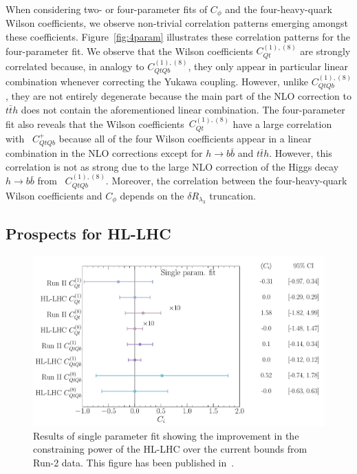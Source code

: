 	When considering two- or four-parameter fits of $C_\phi$ and the four-heavy-quark Wilson coefficients, we observe non-trivial correlation patterns emerging amongst these coefficients.  Figure~\ref{fig:4param} illustrates these correlation patterns for the four-parameter fit. 
	We observe that the Wilson coefficients $C_{Qt}^{(1),(8) }$ are strongly correlated because, in analogy to $C_{QtQb}^{(1),(8) }$, they only appear in particular linear combination whenever correcting the Yukawa coupling. However,  unlike $C_{QtQb}^{(1),(8) }$, they are not entirely degenerate because the main part of the NLO correction to $t\bar t h$ does not contain the aforementioned linear combination.  The four-parameter fit also reveals that the Wilson coefficients~$C_{Qt}^{(1),(8) }$ have a large correlation with ~$C_{QtQb}^{+}$ because all of the four Wilson coefficients appear in a linear combination in the NLO corrections except for $ h\to b\bar b$ and $ t\bar{t} h$. However, this correlation is not as strong due to the large NLO correction of the Higgs decay $h \to b \bar b$ from ~$C_{QtQb}^{(1),(8) }$. Moreover, the correlation between the four-heavy-quark Wilson coefficients and $C_{\phi}$ depends on the $\delta R_{\lambda_3}$ truncation. 
	
	\subsection{Prospects for HL-LHC}
	\begin{figure}[t!]
		\begin{center}
			\includegraphics[width=0.75\linewidth]{fig/uebeblick_forest_ci}
		\end{center}
		\caption{ Results of single parameter fit showing the improvement in the constraining power of the HL-LHC over the current bounds from Run-2 data.  This figure has been published in~\cite{Alasfar:2022zyr}. \label{fig:HLLHC} }
	\end{figure}
	
